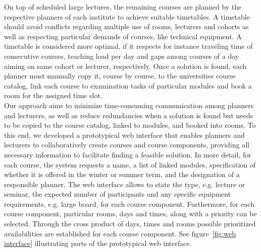 \documentclass{easychair}
\begin{document}
  On top of scheduled large lectures, the remaining courses are planned by the respective planners of each institute to achieve suitable timetables. 
  A timetable should avoid conflicts regarding multiple use of rooms, lecturers and cohorts as well as respecting particular demands of courses, like technical equipment.
  A timetable is considered more optimal, if it respects for instance traveling time of consecutive courses, teaching load per day and gaps among courses of a day aiming on same cohort or lecturer, respectively. 
  Once a solution is found, each planner must manually copy it, course by course, to the universities course catalog, link each course to examination tasks of particular modules and book a room for the assigned time slot. \\
  Our approach aims to minimize time-consuming communication among planners and lecturers, as well as reduce redundancies when a solution is found but needs to be copied to the course catalog, linked to modules, and booked into rooms.
  To this end, we developed a prototypical web interface that enables planners and lecturers to collaboratively create courses and course components, providing all necessary information to facilitate finding a feasible solution.
  In more detail, for each course, the system requests a name, a list of linked modules, specification of whether it is offered in the winter or summer term, and the designation of a responsible planner.
  The web interface allows to state the type, e.g. lecture or seminar, the expected number of participants and any specific equipment requirements, e.g. large board, for each course component.  
  Furthermore, for each course component, particular rooms, days and times, along with a priority can be selected.
  Through  the cross product of days, times and rooms possible prioritized availabilities are established for each course component. 
  See figure~\ref{fig:web interface} illustrating parts of the prototypical web interface. 
\end{document}
